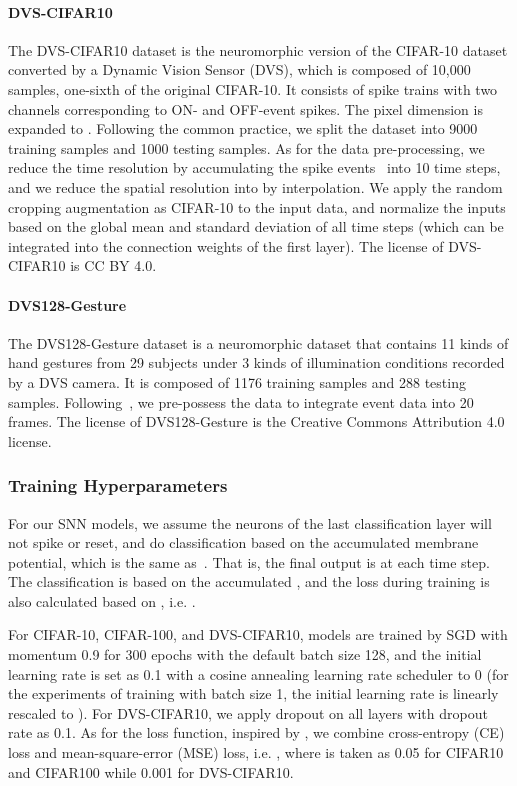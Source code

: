 \documentclass{article}
\begin{document}
\paragraph{DVS-CIFAR10}
The DVS-CIFAR10 dataset is the neuromorphic version of the CIFAR-10 dataset converted by a Dynamic Vision Sensor (DVS), which is composed of 10,000 samples, one-sixth of the original CIFAR-10. It consists of spike trains with two channels corresponding to ON- and OFF-event spikes. The pixel dimension is expanded to . Following the common practice, we split the dataset into 9000 training samples and 1000 testing samples. As for the data pre-processing, we reduce the time resolution by accumulating the spike events~\cite{Fang_2021_ICCV} into 10 time steps, and we reduce the spatial resolution into  by interpolation. We apply the random cropping augmentation as CIFAR-10 to the input data, and normalize the inputs based on the global mean and standard deviation of all time steps (which can be integrated into the connection weights of the first layer). The license of DVS-CIFAR10 is CC BY 4.0.

\paragraph{DVS128-Gesture}
The DVS128-Gesture dataset is a neuromorphic dataset that contains 11 kinds of hand gestures from 29 subjects under 3 kinds of illumination
conditions recorded by a DVS camera. It is composed of 1176 training samples and 288 testing samples. Following~\cite{Fang_2021_ICCV}, we pre-possess the data to integrate event data into 20 frames. 
The license of DVS128-Gesture is the Creative Commons Attribution 4.0 license.


\subsubsection{Training Hyperparameters}

For our SNN models, we assume the neurons of the last classification layer will not spike or reset, and do classification based on the accumulated membrane potential, which is the same as~\cite{xiao2021training}. That is, the final output is  at each time step. The classification is based on the accumulated , and the loss during training is also calculated based on , i.e. .

For CIFAR-10, CIFAR-100, and DVS-CIFAR10, models are trained by SGD with momentum 0.9 for 300 epochs with the default batch size 128, and the initial learning rate is set as 0.1 with a cosine annealing learning rate scheduler to 0 (for the experiments of training with batch size 1, the initial learning rate is linearly rescaled to ). For DVS-CIFAR10, we apply dropout on all layers with dropout rate as 0.1. As for the loss function, inspired by \cite{deng2021temporal}, we combine cross-entropy (CE) loss and mean-square-error (MSE) loss, i.e. , where  is taken as 0.05 for CIFAR10 and CIFAR100 while 0.001 for DVS-CIFAR10.
\end{document}
